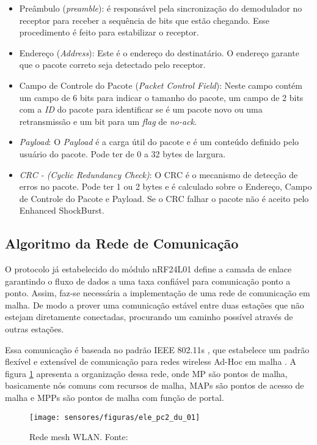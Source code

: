 \begin{itemize}
	\item Preâmbulo (\emph{preamble}): é responsável pela sincronização do demodulador no receptor para receber a sequência de bits que estão chegando. Esse procedimento é feito para estabilizar o receptor.
	\item Endereço (\emph{Address}): Este é o endereço do destinatário. O endereço garante que o pacote correto seja detectado pelo receptor. 
	\item Campo de Controle do Pacote (\emph{Packet Control Field}): Neste campo contém um campo de 6 bits para indicar o tamanho do pacote, um campo de 2 bits com a \emph{ID} do pacote para identificar se é um pacote novo ou uma retransmissão e um bit para um \emph{flag} de \emph{no-ack}.
	\item \emph{Payload}: O \emph{Payload} é a carga útil do pacote e é um conteúdo definido pelo usuário do pacote. Pode ter de 0 a 32 bytes de largura.
	\item \emph{CRC - (Cyclic Redundancy Check)}: O CRC é o mecanismo de detecção de erros no pacote. Pode ter 1 ou 2 bytes e é calculado sobre o Endereço, Campo de Controle do Pacote e Payload. Se o CRC falhar o pacote não é aceito pelo Enhanced ShockBurst\texttrademark.
\end{itemize}

\subsection{Algoritmo da Rede de Comunicação}


O protocolo já estabelecido do módulo nRF24L01 define a camada de enlace garantindo o fluxo de dados a uma taxa confiável para comunicação ponto a ponto. Assim, faz-se necessária a implementação de uma rede de comunicação em malha. De modo a  prover uma comunicação estável entre duas estações que não estejam diretamente conectadas, procurando um caminho possível através de outras estações.

Essa comunicação é baseada no padrão IEEE 802.11s \cite{bib_ele_du_1}, que estabelece um padrão flexível e extensível de comunicação para redes wireless Ad-Hoc em malha \cite{bib_ele_du_5}. A figura \ref{ele_pc2_du_01} apresenta a organização dessa rede, onde MP são pontos de malha, basicamente nós comuns com recursos de malha, MAPs são pontos de acesso de malha e MPPs são pontos de malha com função de portal.

\begin{figure}[H]
\centering
\texttt{[image: sensores/figuras/ele\_pc2\_du\_01]}
\caption{Rede mesh WLAN. Fonte:\cite{bib_ele_du_2}}
\label{ele_pc2_du_01}
\end{figure}


